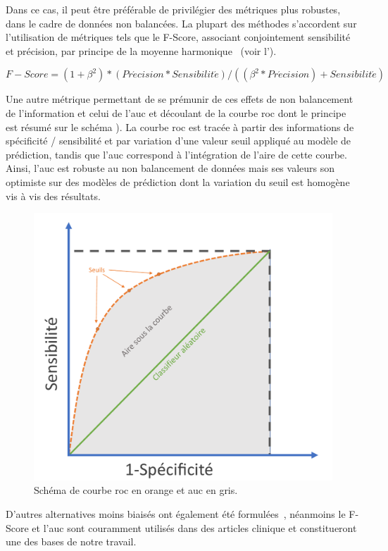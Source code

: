 Dans ce cas, il peut être préférable de privilégier des métriques plus robustes, dans le cadre de données non balancées. La plupart des méthodes s’accordent sur l’utilisation de métriques tels que le F-Score, associant conjointement sensibilité et précision, par principe de la moyenne harmonique~\cite{Guo2008} (voir l').\par
 
\begin{equation} 
    {F-Score}=(1+\beta^2)*(Pr\acute{e}cision*Sensibilit\acute{e})/((\beta^2*Pr\acute{e}cision)+Sensibilit\acute{e})
    \label{eq:metrics_fscore}
\end{equation}
 
Une autre métrique permettant de se prémunir de ces effets de non balancement de l'information et celui de l'\acs{auc} et découlant de la courbe \gls{roc} dont le principe est résumé sur le schéma ). La courbe \gls{roc} est tracée à partir des informations de spécificité / sensibilité et par variation d'une valeur seuil appliqué au modèle de prédiction, tandis que l'\acs{auc} correspond à l'intégration de l'aire de cette courbe. Ainsi, l'\acs{auc} est robuste au non balancement de données mais ses valeurs son optimiste sur des modèles de prédiction dont la variation du seuil est homogène vis à vis des résultats.\par

\begin{figure}[H]
    \centering
    \includegraphics[width=0.6\linewidth]{contents/chapter_3/resources/scheme_roc_curve.pdf}
    \caption{Schéma de courbe \gls{roc} en orange et \gls{auc} en gris.}
    \label{fig:scheme_roc_curve}
\end{figure}

D'autres alternatives moins biaisés ont également été formulées~\cite{Sokolova2006}, néanmoins le F-Score et l'\gls{auc} sont couramment utilisés dans des articles clinique et constitueront une des bases de notre travail.\par

